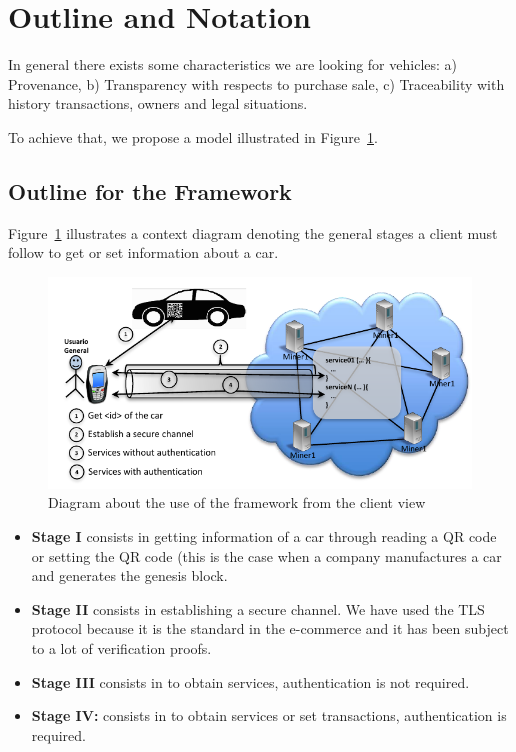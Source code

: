 \section{Outline and Notation}
\label{sec:outline}


In general there exists some characteristics we are looking for vehicles:
a) Provenance,
b) Transparency with respects to purchase sale,
c) Traceability with history transactions, owners and legal situations.

To achieve that, we propose a model illustrated in Figure~\ref{fig:flowChartFramework}.


\subsection{Outline for the Framework}
\label{subsec:proposal}
Figure~\ref{fig:flowChartFramework} illustrates a context diagram denoting
the general stages a client must follow to get or set information about a car. 
\begin{figure}[bt]
  \centering
    \includegraphics[scale=0.7]{images/gralScheme.pdf}
        \caption{Diagram about the use of the framework from the client view}
    \label{fig:flowChartFramework}
\end{figure}

\begin{itemize}
  \item \textbf{Stage I} consists in getting information of a car through reading
    a QR code or setting the QR code (this is the case when a company manufactures a car 
    and generates the genesis block.
  \item \textbf{Stage II} consists in establishing a secure channel. We
    have used the TLS protocol because it is the standard in the
    e-commerce and it has been subject to a lot of verification proofs.  
  \item \textbf{Stage III} consists in to obtain services, authentication
    is not required.   
  \item \textbf{Stage IV:} consists in to obtain services or set transactions, 
    authentication is required.  
\end{itemize}

